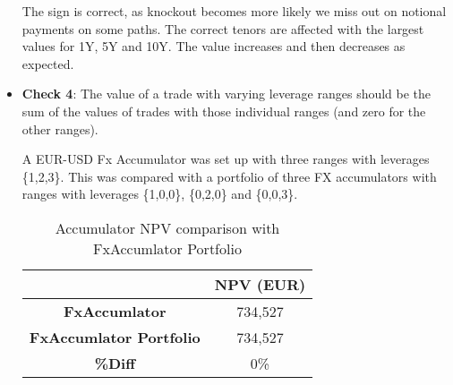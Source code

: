 \begin{itemize}
The sign is correct, as knockout becomes more likely we miss out on notional payments on some paths. The correct tenors are affected with the largest values for 1Y, 5Y and 10Y.
The value increases and then decreases as expected.

\item \textbf{Check 4}: The value of a trade with varying leverage ranges should be the sum of the values of trades with those individual ranges (and zero for the other ranges).

A EUR-USD Fx Accumulator was set up with three ranges with leverages \{1,2,3\}. This was compared with a portfolio of three FX accumulators with ranges with leverages \{1,0,0\}, \{0,2,0\} and \{0,0,3\}.

\begin{table}[H]
\centering
  \begin{tabular}{|c|c|}
    \hline
  & \bfseries{NPV (EUR)}  \\
    \hline
  \bfseries{FxAccumlator} & 734,527 \\
  \bfseries{FxAccumlator Portfolio} & 734,527 \\
  \bfseries{\%Diff} & 0\% \\ 
  \hline
  \end{tabular}
  \caption{Accumulator NPV comparison with FxAccumlator Portfolio}
\end{table}

\end{itemize}

